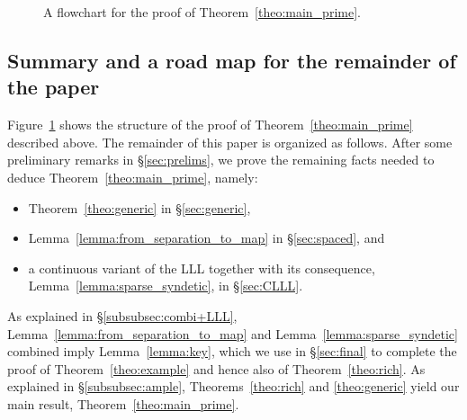\documentclass[11pt,reqno,psamsfonts]{amsart}
\theoremstyle{bfnote}
\theoremstyle{definition}
\theoremstyle{remark}
\newcommand{\0}{\varnothing}
\newcommand{\asi}{\mathsf{asi}}
\newcommand{\casi}{\asi_{\mathsf{c}}}
\numberwithin{equation}{section}
\begin{document}
\begin{figure}[t]
        \caption{A flowchart for the proof of Theorem~\ref{theo:main_prime}.}\label{fig:flowchart}
	\end{figure}

    \subsection{Summary and a road map for the remainder of the paper}

    Figure~\ref{fig:flowchart} shows the structure of the proof of Theorem~\ref{theo:main_prime} described above. The remainder of this paper is organized as follows. After some preliminary remarks in \S\ref{sec:prelims}, we prove the remaining facts needed to deduce Theorem~\ref{theo:main_prime}, namely:
    \begin{itemize}
        \item
        Theorem~\ref{theo:generic} in \S\ref{sec:generic},
        \item
        Lemma~\ref{lemma:from_separation_to_map} in \S\ref{sec:spaced}, and
        \item
        a continuous variant of the LLL together with its consequence, Lemma~\ref{lemma:sparse_syndetic}, in \S\ref{sec:CLLL}. 
    \end{itemize}
    As explained in \S\ref{subsubsec:combi+LLL}, Lemma~\ref{lemma:from_separation_to_map} and Lemma~\ref{lemma:sparse_syndetic} combined imply Lemma~\ref{lemma:key}, which we use in \S\ref{sec:final} to complete the proof of Theorem~\ref{theo:example} and hence also of Theorem~\ref{theo:rich}. As explained in \S\ref{subsubsec:ample}, Theorems~\ref{theo:rich} and \ref{theo:generic} yield our main result, Theorem~\ref{theo:main_prime}.
    
\end{document}
